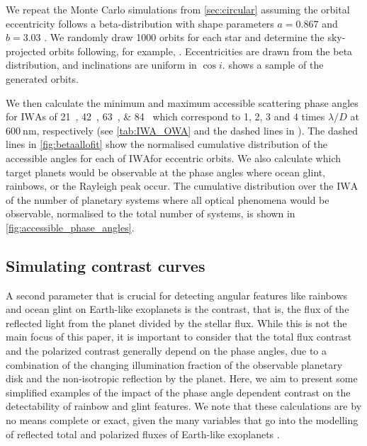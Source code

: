 \documentclass[
    usenatbib,
]{mnras}
\newcommand{\IWA}{\ensuremath{\mathrm{IWA}}}
\begin{document}
We repeat the Monte Carlo simulations from \cref{sec:circular} assuming 
the orbital eccentricity follows a beta-distribution with shape parameters 
$a=0.867$ and $b=3.03$ \citep{2013MNRAS.434L..51K}. 
%
We randomly draw \num{1000} orbits for each star and determine the sky-projected orbits following, for example, \citet{2010exop.book...15M}. 
Eccentricities are drawn from the beta distribution, and inclinations are uniform in $\cos i$. 
 shows a sample of the generated orbits.
%

We then calculate the minimum and maximum accessible scattering phase 
angles for \IWA{}s of \qtylist{21; 42; 63; 84}{\mas} which correspond to 1, 2, 3 and 4 times $\lambda / D$ at $\qty{600}{\nano\meter}$, respectively (see \cref{tab:IWA_OWA} and the dashed lines in ).
%
The dashed lines in \cref{fig:betaallofit} show the normalised cumulative 
distribution of the accessible angles for each of \IWA for eccentric orbits. 
%
We also calculate which target planets would be observable at the phase angles where ocean glint, rainbows, or the Rayleigh peak occur.
%
The cumulative distribution over the \IWA{} of the number of planetary systems where all optical phenomena would be observable, normalised to the total number of systems, is shown in \cref{fig:accessible_phase_angles}.
%

\subsection{Simulating contrast curves}
\label{subsec:2.4}

A second parameter that is crucial for detecting angular features like 
rainbows and ocean glint on Earth-like exoplanets is the contrast, that is, the flux of the reflected light from the planet divided by the stellar flux. 
%
While this is not the main focus of this paper, it is important to consider that the total flux contrast and the polarized contrast generally 
depend on the phase angles, due to a combination of the changing illumination fraction of the observable planetary disk and the non-isotropic reflection by the planet.
%
Here, we aim to present some simplified examples of the impact of the 
phase angle dependent contrast on the detectability of rainbow and 
glint features. 
%
We note that these calculations are by no means complete or exact, given 
the many variables that go into the modelling of reflected total and
polarized fluxes of Earth-like exoplanets \citep{ treesandstam2019,trees2022}.
%
\end{document}
